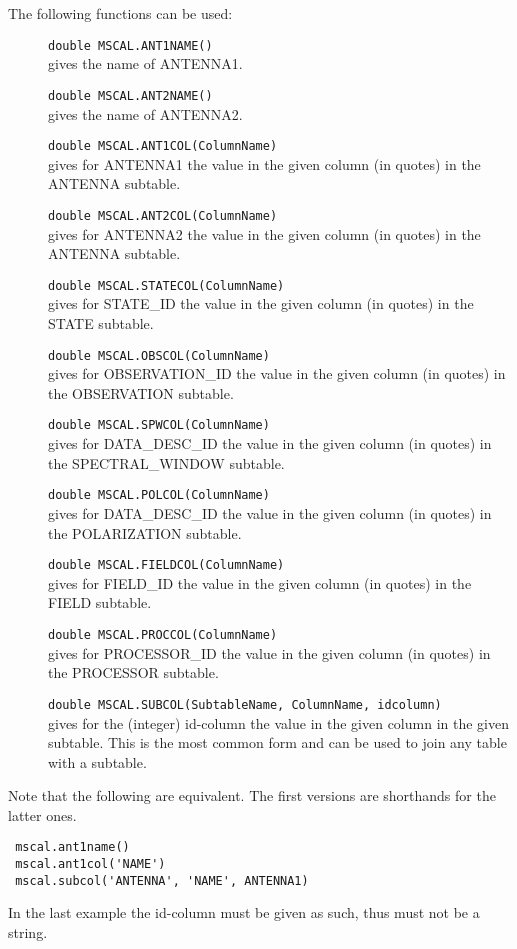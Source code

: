 The following functions can be used:
\begin{description}
  \item[] \texttt{double MSCAL.ANT1NAME()}\\
    gives the name of ANTENNA1.
  \item[] \texttt{double MSCAL.ANT2NAME()}\\
    gives the name of ANTENNA2.
  \item[] \texttt{double MSCAL.ANT1COL(ColumnName)}\\
    gives for ANTENNA1 the value in the given column (in quotes) in
    the ANTENNA subtable.
  \item[] \texttt{double MSCAL.ANT2COL(ColumnName)}\\
    gives for ANTENNA2 the value in the given column (in quotes) in
    the ANTENNA subtable.
  \item[] \texttt{double MSCAL.STATECOL(ColumnName)}\\
    gives for STATE\_ID the value in the given column (in quotes) in
    the STATE subtable.
  \item[] \texttt{double MSCAL.OBSCOL(ColumnName)}\\
    gives for OBSERVATION\_ID the value in the given column (in quotes) in
    the OBSERVATION subtable.
  \item[] \texttt{double MSCAL.SPWCOL(ColumnName)}\\
    gives for DATA\_DESC\_ID the value in the given column (in quotes) in
    the SPECTRAL\_WINDOW subtable.
  \item[] \texttt{double MSCAL.POLCOL(ColumnName)}\\
    gives for DATA\_DESC\_ID the value in the given column (in quotes) in
    the POLARIZATION subtable.
  \item[] \texttt{double MSCAL.FIELDCOL(ColumnName)}\\
    gives for FIELD\_ID the value in the given column (in quotes) in
    the FIELD subtable.
  \item[] \texttt{double MSCAL.PROCCOL(ColumnName)}\\
    gives for PROCESSOR\_ID the value in the given column (in quotes) in
    the PROCESSOR subtable.
  \item[] \texttt{double MSCAL.SUBCOL(SubtableName, ColumnName, idcolumn)}\\
    gives for the (integer) id-column the value in the given column in
    the given subtable. This is the most common form and can be used
    to join any table with a subtable.
\end{description}
Note that the following are equivalent. The first versions are
shorthands for the latter ones.
\begin{verbatim}
 mscal.ant1name()
 mscal.ant1col('NAME')
 mscal.subcol('ANTENNA', 'NAME', ANTENNA1)
\end{verbatim}
In the last example the id-column must be given as such, thus must not
be a string.


